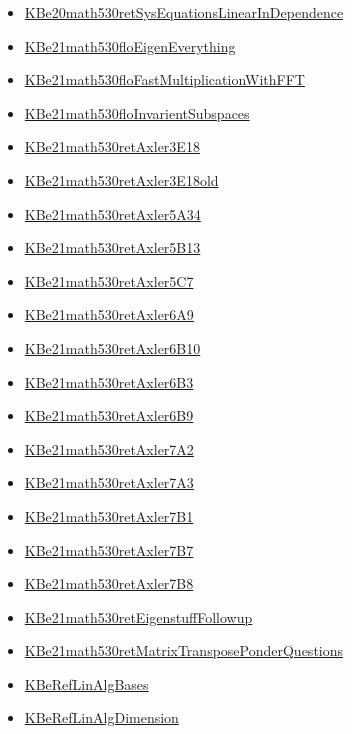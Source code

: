 \documentclass[11pt]{article}
\begin{document}
\begin{itemize}
\begin{itemize}
\item \href{math530/KBe20math530retSysEquationsLinearInDependence.org}{KBe20math530retSysEquationsLinearInDependence}
\item \href{math530/KBe21math530floEigenEverything.org}{KBe21math530floEigenEverything}
\item \href{math530/KBe21math530floFastMultiplicationWithFFT.org}{KBe21math530floFastMultiplicationWithFFT}
\item \href{math530/KBe21math530floInvarientSubspaces.org}{KBe21math530floInvarientSubspaces}
\item \href{math530/KBe21math530retAxler3E18.org}{KBe21math530retAxler3E18}
\item \href{math530/KBe21math530retAxler3E18old.org}{KBe21math530retAxler3E18old}
\item \href{math530/KBe21math530retAxler5A34.org}{KBe21math530retAxler5A34}
\item \href{math530/KBe21math530retAxler5B13.org}{KBe21math530retAxler5B13}
\item \href{math530/KBe21math530retAxler5C7.org}{KBe21math530retAxler5C7}
\item \href{math530/KBe21math530retAxler6A9.org}{KBe21math530retAxler6A9}
\item \href{math530/KBe21math530retAxler6B10.org}{KBe21math530retAxler6B10}
\item \href{math530/KBe21math530retAxler6B3.org}{KBe21math530retAxler6B3}
\item \href{math530/KBe21math530retAxler6B9.org}{KBe21math530retAxler6B9}
\item \href{math530/KBe21math530retAxler7A2.org}{KBe21math530retAxler7A2}
\item \href{math530/KBe21math530retAxler7A3.org}{KBe21math530retAxler7A3}
\item \href{math530/KBe21math530retAxler7B1.org}{KBe21math530retAxler7B1}
\item \href{math530/KBe21math530retAxler7B7.org}{KBe21math530retAxler7B7}
\item \href{math530/KBe21math530retAxler7B8.org}{KBe21math530retAxler7B8}
\item \href{math530/KBe21math530retEigenstuffFollowup.org}{KBe21math530retEigenstuffFollowup}
\item \href{math530/KBe21math530retMatrixTransposePonderQuestions.org}{KBe21math530retMatrixTransposePonderQuestions}
\item \href{math530/KBeRefLinAlgBases.org}{KBeRefLinAlgBases}
\item \href{math530/KBeRefLinAlgDimension.org}{KBeRefLinAlgDimension}

\end{itemize}
\end{itemize}
\end{document}
